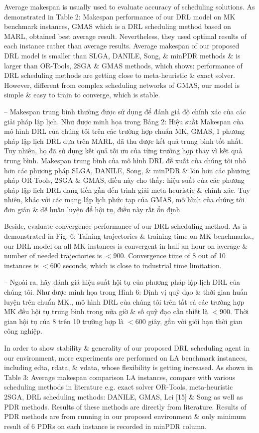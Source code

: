 \documentclass{article}
\begin{document}
\begin{itemize}
\begin{itemize}
        Average makespan is usually used to evaluate accuracy of scheduling solutions. As demonstrated in {\sf Table 2: Makespan performance of our DRL model on MK benchmark instances}, GMAS which is a DRL scheduling method based on MARL, obtained best average result. Nevertheless, they used optimal results of each instance rather than average results. Average makespan of our proposed DRL model is smaller than SLGA, DANILE, Song, \& minPDR methods \& is larger than OR-Tools, 2SGA \& GMAS methods, which shows: performance of DRL scheduling methods are getting close to meta-heuristic \& exact solver. However, different from complex scheduling networks of GMAS, our model is simple \& easy to train to converge, which is stable.

        -- Makespan trung bình thường được sử dụng để đánh giá độ chính xác của các giải pháp lập lịch. Như được minh họa trong {\sf Bảng 2: Hiệu suất Makespan của mô hình DRL của chúng tôi trên các trường hợp chuẩn MK}, GMAS, 1 phương pháp lập lịch DRL dựa trên MARL, đã thu được kết quả trung bình tốt nhất. Tuy nhiên, họ đã sử dụng kết quả tối ưu của từng trường hợp thay vì kết quả trung bình. Makespan trung bình của mô hình DRL đề xuất của chúng tôi nhỏ hơn các phương pháp SLGA, DANILE, Song, \& minPDR \& lớn hơn các phương pháp OR-Tools, 2SGA \& GMAS, điều này cho thấy: hiệu suất của các phương pháp lập lịch DRL đang tiến gần đến trình giải meta-heuristic \& chính xác. Tuy nhiên, khác với các mạng lập lịch phức tạp của GMAS, mô hình của chúng tôi đơn giản \& dễ huấn luyện để hội tụ, điều này rất ổn định.

        Beside, evaluate convergence performance of our DRL scheduling method. As is demonstrated in {\sf Fig. 6: Taining trajectories \& training time on MK benchmarks.}, our DRL model on all MK instances is convergent in half an hour on average \& number of needed trajectories is $< 900$. Convergence time of 8 out of 10 instances is $< 600$ seconds, which is close to industrial time limitation.

        -- Ngoài ra, hãy đánh giá hiệu suất hội tụ của phương pháp lập lịch DRL của chúng tôi. Như được minh họa trong {\sf Hình 6: Định vị quỹ đạo \& thời gian huấn luyện trên chuẩn MK.}, mô hình DRL của chúng tôi trên tất cả các trường hợp MK đều hội tụ trung bình trong nửa giờ \& số quỹ đạo cần thiết là $< 900$. Thời gian hội tụ của 8 trên 10 trường hợp là $< 600$ giây, gần với giới hạn thời gian công nghiệp.

        In order to show stability \& generality of our proposed DRL scheduling agent in our environment, more experiments are performed on LA benchmark instances, including edta, rdata, \& vdata, whose flexibility is getting increased. As shown in {\sf Table 3: Average makespan comparison LA instances}, compare with various scheduling methods in literature e.g. exact solver OR-Tools, meta-heuristic 2SGA, DRL scheduling methods: DANILE, GMAS, Lei [15] \& Song as well as PDR methods. Results of these methods are directly from literature. Results of PDR methods are from running in our proposed environment \& only minimum result of 6 PDRs on each instance is recorded in minPDR column.


\end{itemize}
\end{itemize}
\end{document}
